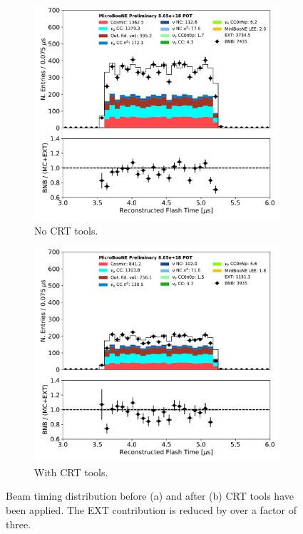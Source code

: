 \begin{figure}[ht] 
\begin{center}
    \begin{subfigure}[b]{0.4\textwidth}
    \centering
    \includegraphics[width=1.00\textwidth]{NuId-Ch3/Images/flash_time_01152020.pdf}
    \caption{\label{fig:crt:pre} No CRT tools.}
    \end{subfigure}
    \begin{subfigure}[b]{0.4\textwidth}
    \centering
    \includegraphics[width=1.00\textwidth]{NuId-Ch3/Images/flash_time_01152020_CRT.pdf}
    \caption{\label{fig:crt:post} With CRT tools.}
    \end{subfigure}
\caption{\label{fig:crt} Beam timing distribution before (a) and after (b) CRT tools have been applied. The EXT contribution is reduced by over a factor of three.}
\end{center}
\end{figure}
